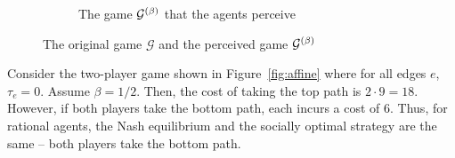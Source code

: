 \documentclass[twoside]{article}
\begin{document}
\begin{multicols}{2}
\begin{figure}[H]
\begin{subfigure}[b]{\linewidth}
    \caption{The game $\mathcal{G}^{(\beta)}$ that the agents perceive}
    \label{fig:affinebet}
  \end{subfigure}
  \caption{The original game $\mathcal{G}$ and the perceived game
  $\mathcal{G}^{(\beta)}$}
\end{figure}
Consider the two-player game shown in Figure~\ref{fig:affine} where for all edges $e$, $\tau_e = 0$. Assume $\beta =
1/2$. Then, the cost of taking the top path is $2 \cdot 9 = 18$. However, if
both players take the bottom path, each incurs a cost of 6. Thus, for rational
agents, the Nash equilibrium and the socially optimal strategy are the same --
both players take the bottom path.


\end{multicols}
\end{document}
